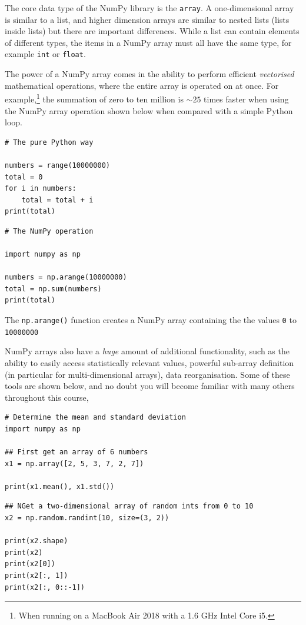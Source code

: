 \documentclass[a4paper]{article}
\begin{document}
The core data type of the NumPy library is the \texttt{array}. A  one-dimensional array is similar to a list, and higher dimension arrays are similar to nested lists (lists inside lists) but there are important differences.
While a list can contain elements of different types, the items in a NumPy array must all have the same type, for example \texttt{int} or \texttt{float}.

The power of a NumPy array comes in the ability to perform efficient \emph{vectorised} mathematical operations, where the entire array is operated on at once.
For example,\footnote{When running on a MacBook Air 2018 with a 1.6 GHz Intel Core i5.} the summation of zero to ten million is $\sim 25$ times faster when using the NumPy array operation shown below when compared with a simple Python loop.
\begin{lstlisting}
# The pure Python way

numbers = range(10000000)
total = 0
for i in numbers:
    total = total + i
print(total)
\end{lstlisting}
\begin{lstlisting}
# The NumPy operation

import numpy as np

numbers = np.arange(10000000)
total = np.sum(numbers)
print(total)
\end{lstlisting}
The \texttt{np.arange()} function creates a NumPy array containing the the values \texttt{0} to \texttt{10000000}

NumPy arrays also have a \emph{huge} amount of additional functionality, such as the ability to easily access statistically relevant values, powerful sub-array definition (in particular for multi-dimensional arrays), data reorganisation.
Some of these tools are shown below, and no doubt you will become familiar with many others throughout this course,
\begin{lstlisting}
# Determine the mean and standard deviation
import numpy as np

## First get an array of 6 numbers
x1 = np.array([2, 5, 3, 7, 2, 7])

print(x1.mean(), x1.std())
\end{lstlisting}

\begin{lstlisting}
## NGet a two-dimensional array of random ints from 0 to 10
x2 = np.random.randint(10, size=(3, 2))

print(x2.shape)
print(x2)
print(x2[0])
print(x2[:, 1])
print(x2[:, 0::-1])
\end{lstlisting}
\end{document}
